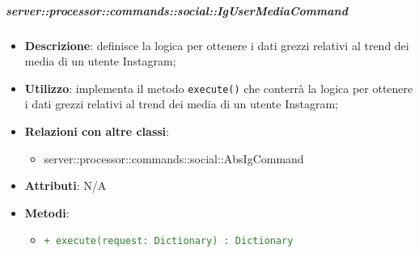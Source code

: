         \subparagraph{server::processor::commands::social::IgUserMediaCommand} %
        \label{subp:bdsm_app_server_processor_commands_social_igusermediacommand}
        \begin{itemize}
          \item \textbf{Descrizione}: definisce la logica per ottenere i dati grezzi relativi al trend dei media di un utente Instagram;
          \item \textbf{Utilizzo}: implementa il metodo \texttt{execute()} che conterrà la logica per ottenere i dati grezzi relativi al trend dei media di un utente Instagram;
          \item \textbf{Relazioni con altre classi}:
            \begin{itemize}
              \item server::processor::commands::social::AbsIgCommand
            \end{itemize}
					\item \textbf{Attributi}: N/A
					\item \textbf{Metodi}:
        	\begin{itemize}
          		\item \textcolor{forestgreen}{\texttt{+ execute(request: Dictionary) : Dictionary}}
        	\end{itemize}
        \end{itemize}


